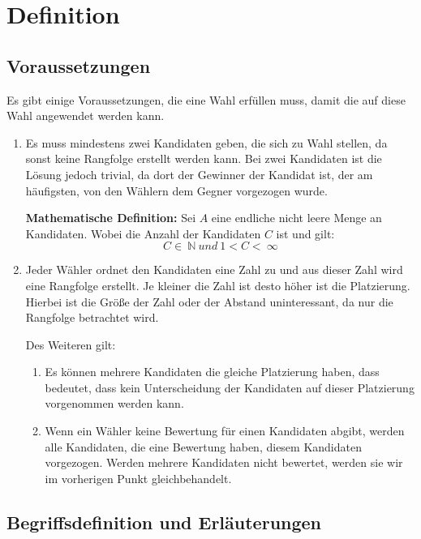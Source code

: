 \section{Definition}
\label{sec:definition}


\subsection{Voraussetzungen} 
\label{sec:voraussetzungen}
Es gibt einige Voraussetzungen, die eine Wahl erfüllen muss, damit die \schulze auf diese Wahl angewendet werden kann.

\begin{enumerate}
\item Es muss mindestens zwei Kandidaten geben, die sich zu Wahl stellen, da sonst keine Rangfolge erstellt werden kann. Bei zwei Kandidaten ist die Lösung jedoch trivial, da dort der Gewinner der Kandidat ist, der am häufigsten, von den Wählern dem Gegner vorgezogen wurde.

\textbf{Mathematische Definition:}
Sei $A$ eine endliche nicht leere Menge an Kandidaten. Wobei die Anzahl der Kandidaten $C$ ist und gilt: 
\[
  C \in\ \mathbb{N}\  und \ 1 < C <\ \infty
\]

\item Jeder Wähler ordnet den Kandidaten eine Zahl zu und aus dieser Zahl wird eine Rangfolge erstellt. Je kleiner die Zahl ist desto höher ist die Platzierung. Hierbei ist die Größe der Zahl oder der Abstand uninteressant, da nur die Rangfolge betrachtet wird.

Des Weiteren gilt:
\begin{enumerate}
\item \label{itm:Regel1} Es können mehrere Kandidaten die gleiche Platzierung haben, dass bedeutet, dass kein Unterscheidung der Kandidaten auf dieser Platzierung vorgenommen werden kann. 
\item Wenn ein Wähler keine Bewertung für einen Kandidaten abgibt, werden alle Kandidaten, die eine Bewertung haben, diesem Kandidaten vorgezogen. Werden mehrere Kandidaten nicht bewertet, werden sie wir im vorherigen Punkt gleichbehandelt.
\end{enumerate}
\end{enumerate}

\subsection{Begriffsdefinition und Erläuterungen } 
\label{sec:begriffsdefinition}


